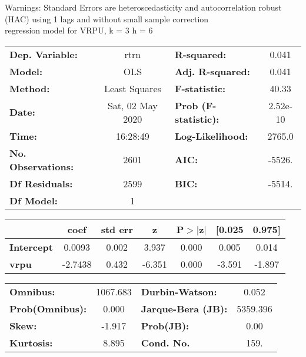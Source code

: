 Warnings: \newline
 [1] Standard Errors are heteroscedasticity and autocorrelation robust (HAC) using 1 lags and without small sample correction\\ 

regression model for VRPU, k = 3 h = 6\begin{center}
\begin{tabular}{lclc}
\toprule
\textbf{Dep. Variable:}    &       rtrn       & \textbf{  R-squared:         } &     0.041   \\
\textbf{Model:}            &       OLS        & \textbf{  Adj. R-squared:    } &     0.041   \\
\textbf{Method:}           &  Least Squares   & \textbf{  F-statistic:       } &     40.33   \\
\textbf{Date:}             & Sat, 02 May 2020 & \textbf{  Prob (F-statistic):} &  2.52e-10   \\
\textbf{Time:}             &     16:28:49     & \textbf{  Log-Likelihood:    } &    2765.0   \\
\textbf{No. Observations:} &        2601      & \textbf{  AIC:               } &    -5526.   \\
\textbf{Df Residuals:}     &        2599      & \textbf{  BIC:               } &    -5514.   \\
\textbf{Df Model:}         &           1      & \textbf{                     } &             \\
\bottomrule
\end{tabular}
\begin{tabular}{lcccccc}
                   & \textbf{coef} & \textbf{std err} & \textbf{z} & \textbf{P$> |$z$|$} & \textbf{[0.025} & \textbf{0.975]}  \\
\midrule
\textbf{Intercept} &       0.0093  &        0.002     &     3.937  &         0.000        &        0.005    &        0.014     \\
\textbf{vrpu}      &      -2.7438  &        0.432     &    -6.351  &         0.000        &       -3.591    &       -1.897     \\
\bottomrule
\end{tabular}
\begin{tabular}{lclc}
\textbf{Omnibus:}       & 1067.683 & \textbf{  Durbin-Watson:     } &    0.052  \\
\textbf{Prob(Omnibus):} &   0.000  & \textbf{  Jarque-Bera (JB):  } & 5359.396  \\
\textbf{Skew:}          &  -1.917  & \textbf{  Prob(JB):          } &     0.00  \\
\textbf{Kurtosis:}      &   8.895  & \textbf{  Cond. No.          } &     159.  \\
\bottomrule
\end{tabular}
\end{center}

